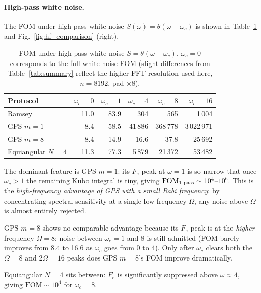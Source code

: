 \documentclass[12pt]{article}
\begin{document}
\paragraph{High-pass white noise.}
The FOM under high-pass white noise $S(\omega) = \theta(\omega - \omega_c)$
is shown in Table~\ref{tab:hfnoise} and Fig.~\ref{fig:hf_comparison} (right).
\begin{table}[h]
\centering
\begin{tabular}{lrrrrr}
\toprule
Protocol & $\omega_c = 0$ & $\omega_c = 1$ & $\omega_c = 4$ & $\omega_c = 8$ & $\omega_c = 16$ \\
\midrule
Ramsey                &  11.0 &    83.9 &      304 &      565 &     1\,004 \\
GPS $m{=}1$           &   8.4 &    58.5 &   41\,886 &  368\,778 &  3\,022\,971 \\
GPS $m{=}8$           &   8.4 &    14.9 &       16.6 &      37.8 &    25\,692 \\
Equiangular $N{=}4$   &  11.3 &    77.3 &    5\,879 &   21\,372 &    53\,482 \\
\bottomrule
\end{tabular}
\caption{FOM under high-pass white noise $S = \theta(\omega - \omega_c)$.
         $\omega_c = 0$ corresponds to the full white-noise FOM
         (slight differences from Table~\ref{tab:summary} reflect the higher FFT
         resolution used here, $n = 8192$, pad $\times 8$).}
\label{tab:hfnoise}
\end{table}

\noindent The dominant feature is GPS $m=1$: its $F_e$ peak at $\omega = 1$ is so
narrow that once $\omega_c > 1$ the remaining Kubo integral is tiny, giving
$\mathrm{FOM}_{1\text{-}{\rm pass}} \sim 10^4$--$10^6$.  This is the
\emph{high-frequency advantage of GPS with a small Rabi frequency}: by
concentrating spectral sensitivity at a single low frequency $\Omega$, any
noise above $\Omega$ is almost entirely rejected.

GPS $m=8$ shows no comparable advantage because its $F_e$ peak is at the
\emph{higher} frequency $\Omega = 8$; noise between $\omega_c = 1$ and $8$ is
still admitted (FOM barely improves from 8.4 to 16.6 as $\omega_c$ goes from
0 to 4).  Only after $\omega_c$ clears both the $\Omega = 8$ and $2\Omega = 16$
peaks does GPS $m=8$'s FOM improve dramatically.

Equiangular $N=4$ sits between: $F_e$ is significantly suppressed above
$\omega \approx 4$, giving $\mathrm{FOM} \sim 10^4$ for $\omega_c = 8$.
\end{document}
